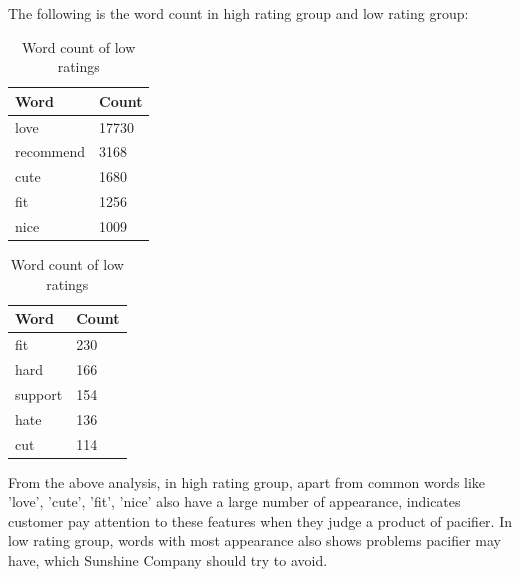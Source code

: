 \documentclass[12pt]{article}
\begin{document}
The following is the word count in high rating group and low rating group:
\begin{table}[!htb]
    \begin{minipage}{.5\linewidth}
      \centering
        \begin{tabular}{ll}
        \hline
            Word & Count \\
            \hline
            love & 17730\\
            \hline
            recommend & 3168\\
            \hline
            cute & 1680\\
            \hline
            fit & 1256\\
            \hline
            nice & 1009\\
            \hline
        \end{tabular}
        \caption{Word count of high ratings}
    \end{minipage}%
    \begin{minipage}{.5\linewidth}
      \centering
               \begin{tabular}{ll}
        \hline
            Word & Count \\
            \hline
            fit & 230\\
            \hline
            hard & 166\\
            \hline
            support & 154\\
            \hline
            hate & 136\\
            \hline
            cut & 114\\
            \hline
        \end{tabular}
        \caption{Word count of low ratings}
    \end{minipage} 
\end{table}
From the above analysis, in high rating group, apart from common words like 'love', 'cute', 'fit', 'nice' also have a large number of appearance, indicates customer pay attention to these features when they judge a product of pacifier. In low rating group, words with most appearance also shows problems pacifier may have, which Sunshine Company should try to avoid. 
\end{document}
